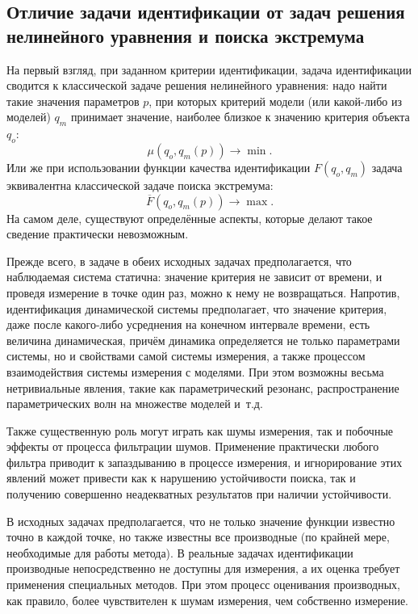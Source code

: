 






\subsection{Отличие задачи идентификации от задач решения нелинейного уравнения и поиска экстремума} %


На первый взгляд, при заданном критерии идентификации, задача идентификации
сводится к классической задаче решения нелинейного уравнения: надо найти такие значения
параметров $p$, при которых критерий модели (или какой-либо из моделей)
$q_m$ принимает значение, наиболее близкое к значению критерия объекта $q_o$:
\[
  \mu( q_o, q_m(p) ) \to \min.
\]
Или же при использовании функции качества идентификации $F(q_o, q_m )$ задача
эквивалентна классической задаче поиска экстремума:
\[
  \overline{F}( q_o, q_m(p) ) \to \max.
\]
На самом деле, существуют определённые аспекты, которые делают такое
сведение практически невозможным.

Прежде всего, в задаче в обеих исходных задачах
предполагается, что наблюдаемая система статична:
значение критерия не зависит от времени, и проведя измерение
в точке один раз, можно к нему не возвращаться.
Напротив, идентификация динамической системы предполагает,
что значение критерия, даже после какого-либо усреднения на конечном
интервале времени, есть величина динамическая, причём динамика определяется
не только параметрами системы, но и свойствами самой системы измерения,
а также процессом взаимодействия системы измерения с моделями. При этом
возможны весьма нетривиальные явления, такие как параметрический
резонанс, распространение параметрических волн на множестве моделей и~т.д.

Также существенную роль могут играть как шумы измерения, так и побочные
эффекты от процесса фильтрации шумов.
Применение практически любого фильтра приводит к запаздыванию
в процессе измерения, и игнорирование этих явлений может привести
как к нарушению устойчивости поиска, так и получению совершенно
неадекватных результатов при наличии устойчивости.

В исходных задачах предполагается, что не только
значение функции известно точно в каждой точке, но также известны все производные
(по крайней мере, необходимые для работы метода).
В реальные задачах идентификации производные непосредственно
не доступны для измерения, а их оценка требует применения специальных
методов. При этом процесс оценивания производных, как правило,
более чувствителен к шумам измерения, чем собственно измерение.



